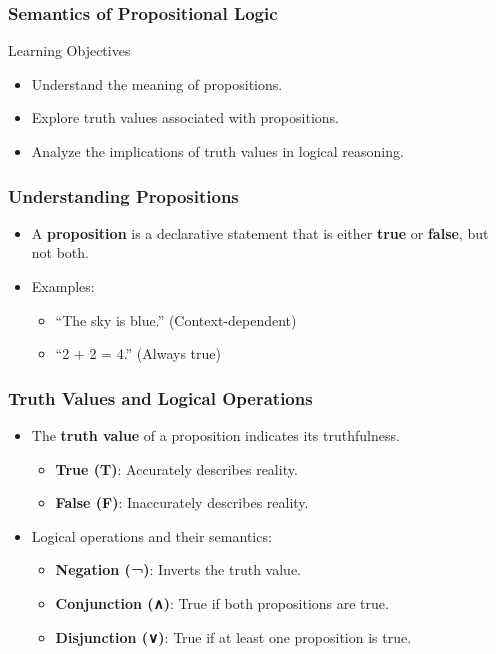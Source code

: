 \documentclass[aspectratio=169]{beamer}
\begin{document}
\begin{frame}[fragile]
  \frametitle{Semantics of Propositional Logic}
  \begin{block}{Learning Objectives}
    \begin{itemize}
      \item Understand the meaning of propositions.
      \item Explore truth values associated with propositions.
      \item Analyze the implications of truth values in logical reasoning.
    \end{itemize}
  \end{block}
\end{frame}

\begin{frame}[fragile]
  \frametitle{Understanding Propositions}
  \begin{itemize}
    \item A \textbf{proposition} is a declarative statement that is either \textbf{true} or \textbf{false}, but not both.
    \item Examples:
      \begin{itemize}
        \item “The sky is blue.” (Context-dependent)
        \item “2 + 2 = 4.” (Always true)
      \end{itemize}
  \end{itemize}
\end{frame}

\begin{frame}[fragile]
  \frametitle{Truth Values and Logical Operations}
  \begin{itemize}
    \item The \textbf{truth value} of a proposition indicates its truthfulness.
      \begin{itemize}
        \item \textbf{True (T)}: Accurately describes reality.
        \item \textbf{False (F)}: Inaccurately describes reality.
      \end{itemize}
  
    \item Logical operations and their semantics:
      \begin{itemize}
        \item \textbf{Negation (¬)}: Inverts the truth value.
        \item \textbf{Conjunction (∧)}: True if both propositions are true.
        \item \textbf{Disjunction (∨)}: True if at least one proposition is true.
      \end{itemize}
  \end{itemize}
\end{frame}
\end{document}
